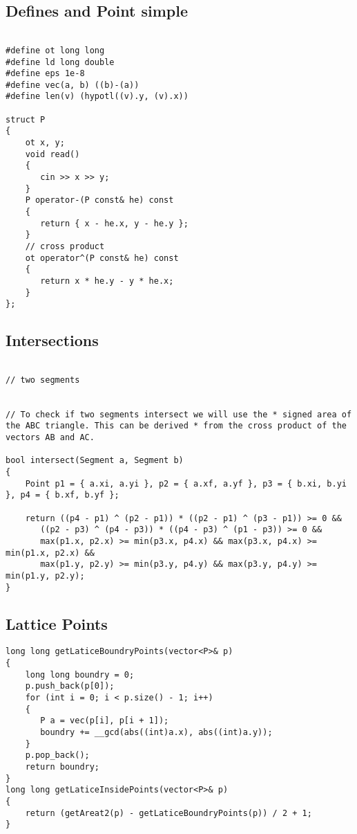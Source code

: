 \documentclass{article}
\begin{document}
\subsection{Defines and Point simple}
\begin{verbatim}
  
#define ot long long  
#define ld long double  
#define eps 1e-8    
#define vec(a, b) ((b)-(a))  
#define len(v) (hypotl((v).y, (v).x))  
  
struct P  
{  
    ot x, y;  
    void read()  
    {  
       cin >> x >> y;  
    }  
    P operator-(P const& he) const  
    {  
       return { x - he.x, y - he.y };  
    }  
    // cross product    
	ot operator^(P const& he) const  
    {  
       return x * he.y - y * he.x;  
    }  
};
\end{verbatim}

\subsection{Intersections}
\begin{verbatim}
  
// two segments
  
  
// To check if two segments intersect we will use the * signed area of the ABC triangle. This can be derived * from the cross product of the vectors AB and AC. 
 
bool intersect(Segment a, Segment b)  
{  
    Point p1 = { a.xi, a.yi }, p2 = { a.xf, a.yf }, p3 = { b.xi, b.yi }, p4 = { b.xf, b.yf };  
  
    return ((p4 - p1) ^ (p2 - p1)) * ((p2 - p1) ^ (p3 - p1)) >= 0 &&  
       ((p2 - p3) ^ (p4 - p3)) * ((p4 - p3) ^ (p1 - p3)) >= 0 &&  
       max(p1.x, p2.x) >= min(p3.x, p4.x) && max(p3.x, p4.x) >= min(p1.x, p2.x) &&  
       max(p1.y, p2.y) >= min(p3.y, p4.y) && max(p3.y, p4.y) >= min(p1.y, p2.y);  
}
\end{verbatim}

\subsection{Lattice Points}
\begin{verbatim}
long long getLaticeBoundryPoints(vector<P>& p)  
{  
    long long boundry = 0;  
    p.push_back(p[0]);  
    for (int i = 0; i < p.size() - 1; i++)  
    {  
       P a = vec(p[i], p[i + 1]);  
       boundry += __gcd(abs((int)a.x), abs((int)a.y));  
    }  
    p.pop_back();  
    return boundry;  
}  
long long getLaticeInsidePoints(vector<P>& p)  
{  
    return (getAreat2(p) - getLaticeBoundryPoints(p)) / 2 + 1;  
}  
\end{verbatim}
\end{document}
